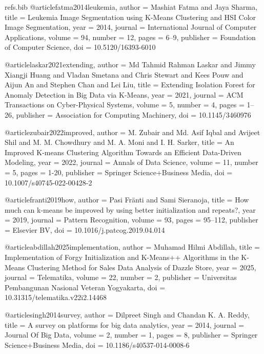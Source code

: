 \begin{filecontents*}[overwrite]{refs.bib}
@article{fatma2014leukemia,
  author = {Mashiat Fatma and Jaya Sharma},
  title = {{Leukemia Image Segmentation using K-Means Clustering and HSI Color Image Segmentation}},
  year = {2014},
  journal = {International Journal of Computer Applications},
  volume = {94},
  number = {12},
  pages = {6--9},
  publisher = {Foundation of Computer Science},
  doi = {10.5120/16393-6010}
}

@article{laskar2021extending,
  author = {Md Tahmid Rahman Laskar and Jimmy Xiangji Huang and Vladan Smetana and Chris Stewart and Kees Pouw and Aijun An and Stephen Chan and Lei Liu},
  title = {{Extending Isolation Forest for Anomaly Detection in Big Data via K-Means}},
  year = {2021},
  journal = {ACM Transactions on Cyber-Physical Systems},
  volume = {5},
  number = {4},
  pages = {1--26},
  publisher = {Association for Computing Machinery},
  doi = {10.1145/3460976}
}

@article{zubair2022improved,
  author = {M. Zubair and Md. Asif Iqbal and Avijeet Shil and M. M. Chowdhury and M. A. Moni and I. H. Sarker},
  title = {{An Improved K-means Clustering Algorithm Towards an Efficient Data-Driven Modeling}},
  year = {2022},
  journal = {Annals of Data Science},
  volume = {11},
  number = {5},
  pages = {1-20},
  publisher = {Springer Science+Business Media},
  doi = {10.1007/s40745-022-00428-2}
}

@article{franti2019how,
  author = {Pasi Fr{\"a}nti and Sami Sieranoja},
  title = {{How much can k-means be improved by using better initialization and repeats?}},
  year = {2019},
  journal = {Pattern Recognition},
  volume = {93},
  pages = {95--112},
  publisher = {Elsevier BV},
  doi = {10.1016/j.patcog.2019.04.014}
}

@article{abdillah2025implementation,
  author = {Muhamad Hilmi Abdillah},
  title = {{Implementation of Forgy Initialization and K-Means++ Algorithms in the K-Means Clustering Method for Sales Data Analysis of Dazzle Store}},
  year = {2025},
  journal = {Telematika},
  volume = {22},
  number = {2},
  publisher = {Universitas Pembangunan Nasional Veteran Yogyakarta},
  doi = {10.31315/telematika.v22i2.14468}
}

@article{singh2014survey,
  author = {Dilpreet Singh and Chandan K. A. Reddy},
  title = {{A survey on platforms for big data analytics}},
  year = {2014},
  journal = {Journal Of Big Data},
  volume = {2},
  number = {1},
  pages = {8},
  publisher = {Springer Science+Business Media},
  doi = {10.1186/s40537-014-0008-6}
}


\end{filecontents*}
